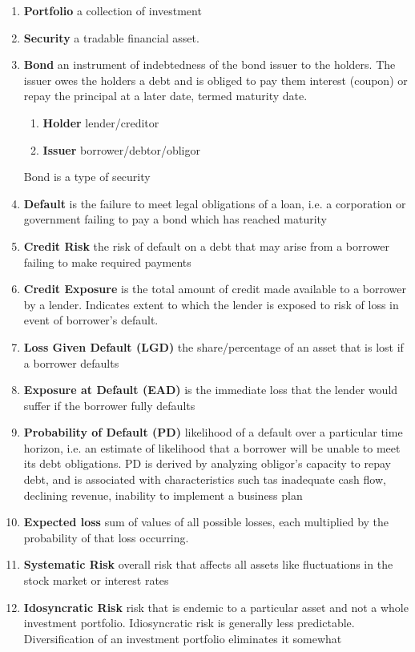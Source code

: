 \documentclass[11pt]{article}
\begin{document}
\begin{enumerate}
    \item \textbf{Portfolio} a collection of investment
    \item \textbf{Security} a tradable financial asset.
    \item \textbf{Bond} an instrument of indebtedness of the bond issuer to the holders. The issuer owes the holders a debt and is obliged to pay them interest (coupon) or repay the principal at a later date, termed maturity date.
    \begin{enumerate}
        \item \textbf{Holder} lender/creditor 
        \item \textbf{Issuer} borrower/debtor/obligor
    \end{enumerate}
    Bond is a type of security
    \item \textbf{Default} is the failure to meet legal obligations of a loan, i.e. a corporation or government failing to pay a bond which has reached maturity
    \item \textbf{Credit Risk} the risk of default on a debt that may arise from a borrower failing to make required payments 
    \item \textbf{Credit Exposure} is the total amount of credit made available to a borrower by a lender. Indicates extent to which the lender is exposed to risk of loss in event of borrower's default. 
    \item \textbf{Loss Given Default (LGD)} the share/percentage of an asset that is lost if a borrower defaults
    \item \textbf{Exposure at Default (EAD)} is the immediate loss that the lender would suffer if the borrower fully defaults
    \item \textbf{Probability of Default (PD)} likelihood of a default over a particular time horizon, i.e. an estimate of likelihood that a borrower will be unable to meet its debt obligations. PD is derived by analyzing obligor's capacity to repay debt, and is associated with characteristics such tas inadequate cash flow, declining revenue, inability to implement a business plan
    \item \textbf{Expected loss} sum of values of all possible losses, each multiplied by the probability of that loss occurring.
    \item \textbf{Systematic Risk} overall risk that affects all assets like fluctuations in the stock market or interest rates
    \item \textbf{Idosyncratic Risk} risk that is endemic to a particular asset and not a whole investment portfolio. Idiosyncratic risk is generally less predictable. Diversification of an investment portfolio eliminates it somewhat
\end{enumerate}
\end{document}
